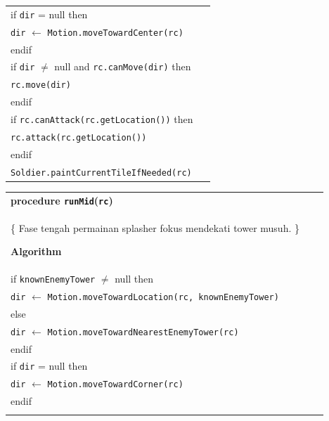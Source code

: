 \documentclass{article}
\newenvironment{pseudobox}
{
\centering
\begin{longtable}{|p{0.94\linewidth}|}
\hline
}
{
\\ \hline
\end{longtable}
\vspace{0.05cm}
}
\begin{document}
\begin{enumerate}[label=\alph*.]
\begin{pseudobox}
\hspace*{1.5em}if \texttt{dir} = null then \\
\hspace*{3em}\texttt{dir} $\leftarrow$ \texttt{Motion.moveTowardCenter(rc)} \\
\hspace*{1.5em}endif \\

\hspace*{1.5em}if \texttt{dir} $\neq$ null and \texttt{rc.canMove(dir)} then \\
\hspace*{3em}\texttt{rc.move(dir)} \\
\hspace*{1.5em}endif \\

\hspace*{1.5em}if \texttt{rc.canAttack(rc.getLocation())} then \\
\hspace*{3em}\texttt{rc.attack(rc.getLocation())} \\
\hspace*{1.5em}endif \\

\hspace*{1.5em}\texttt{Soldier.paintCurrentTileIfNeeded(rc)}

\end{pseudobox}
\begin{pseudobox}
\textbf{procedure \texttt{runMid}(\texttt{rc})} \\
\{ Fase tengah permainan splasher fokus mendekati tower musuh. \}

\textbf{Algorithm} \\

\hspace*{1.5em}if \texttt{knownEnemyTower} $\neq$ null then \\
\hspace*{3em}\texttt{dir} $\leftarrow$ \texttt{Motion.moveTowardLocation(rc, knownEnemyTower)} \\
\hspace*{1.5em}else \\
\hspace*{3em}\texttt{dir} $\leftarrow$ \texttt{Motion.moveTowardNearestEnemyTower(rc)} \\
\hspace*{1.5em}endif \\

\hspace*{1.5em}if \texttt{dir} = null then \\
\hspace*{3em}\texttt{dir} $\leftarrow$ \texttt{Motion.moveTowardCorner(rc)} \\
\hspace*{1.5em}endif \\


\end{pseudobox}
\end{enumerate}
\end{document}
